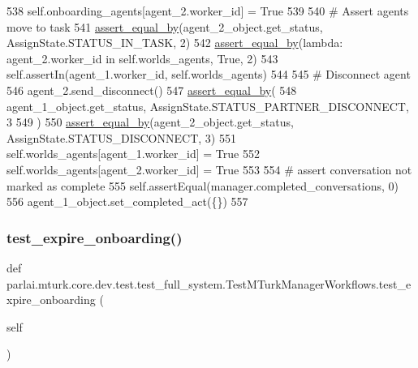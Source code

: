 \begin{DoxyCode}
538         self.onboarding\_agents[agent\_2.worker\_id] = \textcolor{keyword}{True}
539 
540         \textcolor{comment}{# Assert agents move to task}
541         \hyperlink{namespaceparlai_1_1mturk_1_1core_1_1test_1_1test__full__system_a0b463246d35658a2e422010f13dcf819}{assert\_equal\_by}(agent\_2\_object.get\_status, AssignState.STATUS\_IN\_TASK, 2)
542         \hyperlink{namespaceparlai_1_1mturk_1_1core_1_1test_1_1test__full__system_a0b463246d35658a2e422010f13dcf819}{assert\_equal\_by}(\textcolor{keyword}{lambda}: agent\_2.worker\_id \textcolor{keywordflow}{in} self.worlds\_agents, \textcolor{keyword}{True}, 2)
543         self.assertIn(agent\_1.worker\_id, self.worlds\_agents)
544 
545         \textcolor{comment}{# Disconnect agent}
546         agent\_2.send\_disconnect()
547         \hyperlink{namespaceparlai_1_1mturk_1_1core_1_1test_1_1test__full__system_a0b463246d35658a2e422010f13dcf819}{assert\_equal\_by}(
548             agent\_1\_object.get\_status, AssignState.STATUS\_PARTNER\_DISCONNECT, 3
549         )
550         \hyperlink{namespaceparlai_1_1mturk_1_1core_1_1test_1_1test__full__system_a0b463246d35658a2e422010f13dcf819}{assert\_equal\_by}(agent\_2\_object.get\_status, AssignState.STATUS\_DISCONNECT, 3)
551         self.worlds\_agents[agent\_1.worker\_id] = \textcolor{keyword}{True}
552         self.worlds\_agents[agent\_2.worker\_id] = \textcolor{keyword}{True}
553 
554         \textcolor{comment}{# assert conversation not marked as complete}
555         self.assertEqual(manager.completed\_conversations, 0)
556         agent\_1\_object.set\_completed\_act(\{\})
557 
\end{DoxyCode}
\mbox{\label{classparlai_1_1mturk_1_1core_1_1dev_1_1test_1_1test__full__system_1_1TestMTurkManagerWorkflows_ad1c8b65395e4d230f2289a0c95da5da0}} 
\subsubsection{\texorpdfstring{test\+\_\+expire\+\_\+onboarding()}{test\_expire\_onboarding()}}
{\footnotesize\ttfamily def parlai.\+mturk.\+core.\+dev.\+test.\+test\+\_\+full\+\_\+system.\+Test\+M\+Turk\+Manager\+Workflows.\+test\+\_\+expire\+\_\+onboarding (\begin{DoxyParamCaption}\item[{}]{self }\end{DoxyParamCaption})}



